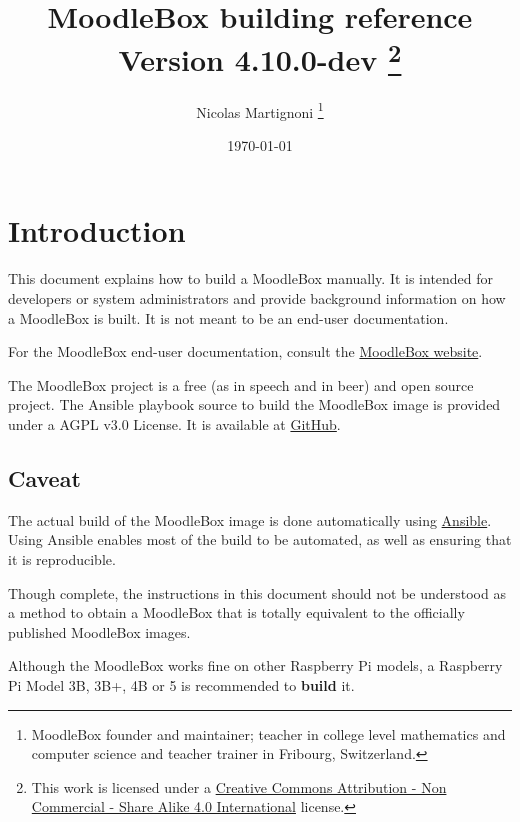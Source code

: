 \documentclass[12pt]{article}
\begin{document}
\title{MoodleBox building reference\\Version 4.10.0-dev%
  \footnote{This work is licensed under a \href{http://creativecommons.org/licenses/by-nc-sa/4.0/}{Creative Commons Attribution - Non Commercial - Share Alike  4.0 International} license.}%
}
\date{\today} %
\author{Nicolas Martignoni%
  \footnote{MoodleBox founder and maintainer; teacher in college level mathematics and computer science and teacher trainer in Fribourg, Switzerland.}%
}
\maketitle

\begingroup
\setlength{\parskip}{3pt plus1pt minus1pt}
\tableofcontents
\endgroup
\clearpage

\section{Introduction}

This document explains how to build a MoodleBox manually.
It is intended for developers or system administrators and provide background information on how a MoodleBox is built.
It is not meant to be an end-user documentation.

For the MoodleBox end-user documentation, consult the \href{https://moodlebox.net/}{MoodleBox website}.

The MoodleBox project is a free (as in speech and in beer) and open source project. The Ansible playbook source to build the MoodleBox image is provided under a AGPL v3.0 License. It is available at \href{https://github.com/moodlebox/moodlebox}{GitHub}.

\subsection{Caveat}

The actual build of the MoodleBox image is done automatically using \href{https://www.ansible.com/}{Ansible}.
Using Ansible enables most of the build to be automated, as well as ensuring that it is reproducible.

Though complete, the instructions in this document should not be understood as a method to obtain a MoodleBox that is totally equivalent to the officially published MoodleBox images.

Although the MoodleBox works fine on other Raspberry Pi models, a Raspberry Pi Model 3B, 3B+, 4B or 5 is recommended to \textbf{build} it.
\end{document}
